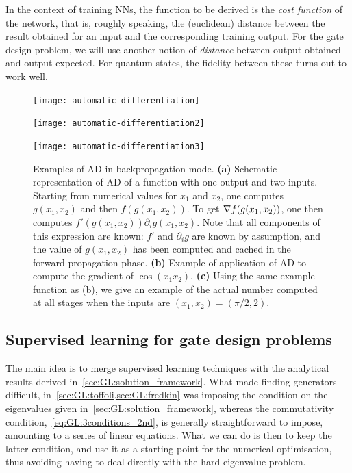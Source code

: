 In the context of training NNs, the function to be derived is the \emph{cost function} of the network, that is, roughly speaking, the (euclidean) distance between the result obtained for an input and the corresponding training output.
For the gate design problem, we will use another notion of \emph{distance} between output obtained and output expected.
For quantum states, the fidelity between these turns out to work well.

\begin{figure}[tb]
	\centering
	\begin{minipage}{0.3\linewidth}
		\centering
		\texttt{[image: automatic-differentiation]}
	\end{minipage}\hfill
	\begin{minipage}{0.3\linewidth}
		\centering
		\texttt{[image: automatic-differentiation2]}
	\end{minipage}\hfill
	\begin{minipage}{0.3\linewidth}
		\centering
		\texttt{[image: automatic-differentiation3]}
	\end{minipage}
	\caption{
		Examples of \ac{AD} in backpropagation mode.
		\textbf{(a)}
		Schematic representation of \ac{AD} of a function with one output and two inputs.
		Starting from numerical values for $x_1$ and $x_2$, one computes $g(x_1, x_2)$ and then $f(g(x_1, x_2))$.
		To get $\nabla f(g(x_1, x_2))$, one then computes $f'(g(x_1, x_2))\partial_i g(x_1, x_2)$.
		Note that all components of this expression are known: $f'$ and $\partial_i g$ are known by assumption, and the value of $g(x_1, x_2)$ has been computed and cached in the forward propagation phase.
		\textbf{(b)} Example of application of \ac{AD} to compute the gradient of $\cos(x_1 x_2)$.
		\textbf{(c)} Using the same example function as (b), we give an example of the actual number computed at all stages when the inputs are $(x_1, x_2) = (\pi / 2, 2)$.
	}
	\label{fig:automatic-differentiation}
\end{figure}

\subsection{Supervised learning for gate design problems}
\label{subsec:GL:supervised_learning_for_GL}

The main idea is to merge supervised learning techniques with the analytical results derived in~\cref{sec:GL:solution_framework}.
What made finding generators difficult, in~\cref{sec:GL:toffoli,sec:GL:fredkin} was imposing the condition on the eigenvalues given in~\cref{sec:GL:solution_framework}, whereas the commutativity condition,~\cref{eq:GL:3conditions_2nd}, is generally straightforward to impose, amounting to a series of linear equations.
What we can do is then to keep the latter condition, and use it as a starting point for the numerical optimisation, thus avoiding having to deal directly with the hard eigenvalue problem.

